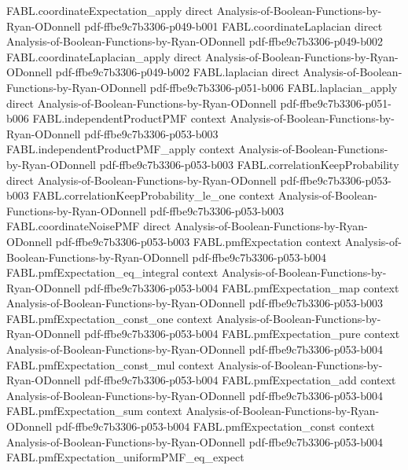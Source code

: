 \begin{theorem}
\proofstep
  {FABL.coordinateExpectation_apply}
  {direct}
  {Analysis-of-Boolean-Functions-by-Ryan-ODonnell}
  {pdf-ffbe9c7b3306-p049-b001}
\proofstep
  {FABL.coordinateLaplacian}
  {direct}
  {Analysis-of-Boolean-Functions-by-Ryan-ODonnell}
  {pdf-ffbe9c7b3306-p049-b002}
\proofstep
  {FABL.coordinateLaplacian_apply}
  {direct}
  {Analysis-of-Boolean-Functions-by-Ryan-ODonnell}
  {pdf-ffbe9c7b3306-p049-b002}
\proofstep
  {FABL.laplacian}
  {direct}
  {Analysis-of-Boolean-Functions-by-Ryan-ODonnell}
  {pdf-ffbe9c7b3306-p051-b006}
\proofstep
  {FABL.laplacian_apply}
  {direct}
  {Analysis-of-Boolean-Functions-by-Ryan-ODonnell}
  {pdf-ffbe9c7b3306-p051-b006}
\proofstep
  {FABL.independentProductPMF}
  {context}
  {Analysis-of-Boolean-Functions-by-Ryan-ODonnell}
  {pdf-ffbe9c7b3306-p053-b003}
\proofstep
  {FABL.independentProductPMF_apply}
  {context}
  {Analysis-of-Boolean-Functions-by-Ryan-ODonnell}
  {pdf-ffbe9c7b3306-p053-b003}
\proofstep
  {FABL.correlationKeepProbability}
  {direct}
  {Analysis-of-Boolean-Functions-by-Ryan-ODonnell}
  {pdf-ffbe9c7b3306-p053-b003}
\proofstep
  {FABL.correlationKeepProbability_le_one}
  {context}
  {Analysis-of-Boolean-Functions-by-Ryan-ODonnell}
  {pdf-ffbe9c7b3306-p053-b003}
\proofstep
  {FABL.coordinateNoisePMF}
  {direct}
  {Analysis-of-Boolean-Functions-by-Ryan-ODonnell}
  {pdf-ffbe9c7b3306-p053-b003}
\proofstep
  {FABL.pmfExpectation}
  {context}
  {Analysis-of-Boolean-Functions-by-Ryan-ODonnell}
  {pdf-ffbe9c7b3306-p053-b004}
\proofstep
  {FABL.pmfExpectation_eq_integral}
  {context}
  {Analysis-of-Boolean-Functions-by-Ryan-ODonnell}
  {pdf-ffbe9c7b3306-p053-b004}
\proofstep
  {FABL.pmfExpectation_map}
  {context}
  {Analysis-of-Boolean-Functions-by-Ryan-ODonnell}
  {pdf-ffbe9c7b3306-p053-b003}
\proofstep
  {FABL.pmfExpectation_const_one}
  {context}
  {Analysis-of-Boolean-Functions-by-Ryan-ODonnell}
  {pdf-ffbe9c7b3306-p053-b004}
\proofstep
  {FABL.pmfExpectation_pure}
  {context}
  {Analysis-of-Boolean-Functions-by-Ryan-ODonnell}
  {pdf-ffbe9c7b3306-p053-b004}
\proofstep
  {FABL.pmfExpectation_const_mul}
  {context}
  {Analysis-of-Boolean-Functions-by-Ryan-ODonnell}
  {pdf-ffbe9c7b3306-p053-b004}
\proofstep
  {FABL.pmfExpectation_add}
  {context}
  {Analysis-of-Boolean-Functions-by-Ryan-ODonnell}
  {pdf-ffbe9c7b3306-p053-b004}
\proofstep
  {FABL.pmfExpectation_sum}
  {context}
  {Analysis-of-Boolean-Functions-by-Ryan-ODonnell}
  {pdf-ffbe9c7b3306-p053-b004}
\proofstep
  {FABL.pmfExpectation_const}
  {context}
  {Analysis-of-Boolean-Functions-by-Ryan-ODonnell}
  {pdf-ffbe9c7b3306-p053-b004}
\proofstep
  {FABL.pmfExpectation_uniformPMF_eq_expect}

\end{theorem}
